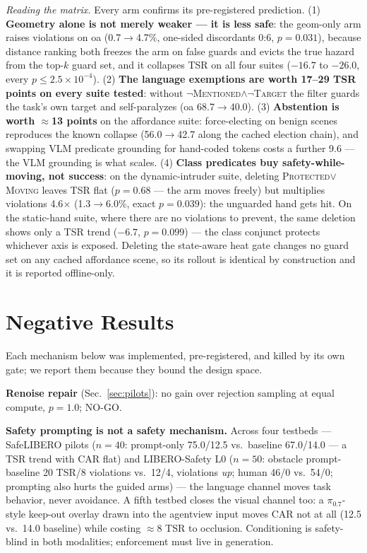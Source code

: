 \documentclass[conference]{IEEEtran}
\begin{document}
\emph{Reading the matrix.} Every arm confirms its pre-registered prediction. (1) \textbf{Geometry alone is not merely weaker --- it is less safe}: the geom-only arm raises violations on oa (0.7$\to$4.7\%, one-sided discordants 0:6, $p=0.031$), because distance ranking both freezes the arm on false guards and evicts the true hazard from the top-$k$ guard set, and it collapses TSR on all four suites ($-16.7$ to $-26.0$, every $p\le2.5\times10^{-4}$). (2) \textbf{The language exemptions are worth 17--29 TSR points on every suite tested}: without $\lnot$\textsc{Mentioned}$\wedge\lnot$\textsc{Target} the filter guards the task's own target and self-paralyzes (oa 68.7$\to$40.0). (3) \textbf{Abstention is worth $\approx$13 points} on the affordance suite: force-electing on benign scenes reproduces the known collapse (56.0$\to$42.7 along the cached election chain), and swapping VLM predicate grounding for hand-coded tokens costs a further 9.6 --- the VLM grounding is what scales. (4) \textbf{Class predicates buy safety-while-moving, not success}: on the dynamic-intruder suite, deleting \textsc{Protected}$\vee$\textsc{Moving} leaves TSR flat ($p=0.68$ --- the arm moves freely) but multiplies violations 4.6$\times$ (1.3$\to$6.0\%, exact $p=0.039$): the unguarded hand gets hit. On the static-hand suite, where there are no violations to prevent, the same deletion shows only a TSR trend ($-6.7$, $p=0.099$) --- the class conjunct protects whichever axis is exposed. Deleting the state-aware heat gate changes no guard set on any cached affordance scene, so its rollout is identical by construction and it is reported offline-only.

\section{Negative Results}
\label{sec:negative}

Each mechanism below was implemented, pre-registered, and killed by its own gate; we report them because they bound the design space.

\textbf{Renoise repair} (Sec.~\ref{sec:pilots}): no gain over rejection sampling at equal compute, $p=1.0$; NO-GO.

\textbf{Safety prompting is not a safety mechanism.} Across four testbeds --- SafeLIBERO pilots ($n{=}40$: prompt-only 75.0/12.5 vs.\ baseline 67.0/14.0 --- a TSR trend with CAR flat) and LIBERO-Safety L0 ($n{=}50$: obstacle prompt-baseline 20 TSR/8 violations vs.\ 12/4, violations \emph{up}; human 46/0 vs.\ 54/0; prompting also hurts the guided arms) --- the language channel moves task behavior, never avoidance. A fifth testbed closes the visual channel too: a $\pi_{0.7}$-style keep-out overlay drawn into the agentview input moves CAR not at all (12.5 vs.\ 14.0 baseline) while costing $\approx$8 TSR to occlusion. Conditioning is safety-blind in both modalities; enforcement must live in generation.
\end{document}
